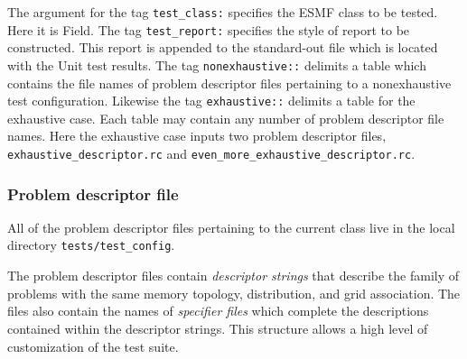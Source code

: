 The argument for the tag \texttt{test\_class:} specifies the ESMF class to be tested. Here it is Field. The tag  \texttt{test\_report:} specifies the style of report to be constructed. This report is appended to the standard-out file which is located with the Unit test results. The tag \texttt{nonexhaustive::} delimits a table which contains the file names of problem descriptor files pertaining to a nonexhaustive test configuration. Likewise the tag \texttt{exhaustive::} delimits a table for the exhaustive case. Each table may contain any number of problem descriptor file names. Here the exhaustive case inputs two problem descriptor files, \texttt{exhaustive\_descriptor.rc} and \texttt{even\_more\_exhaustive\_descriptor.rc}.

\subsubsection{Problem descriptor file}
All of the problem descriptor files pertaining to the current class live in the local directory \texttt{tests/test\_config}.

The problem descriptor files contain \textit{descriptor strings} that describe the family of problems with the same memory topology, distribution, and grid association. The files also contain the names of \textit{specifier files} which complete the descriptions contained within the descriptor strings. This structure allows a high level of customization of the test suite.

